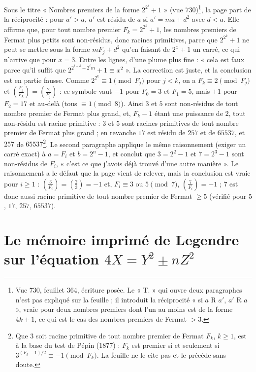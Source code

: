 \documentclass[11pt,a4paper]{article}
\begin{document}
Sous le titre « Nombres premiers de la forme $2^{2^i}+1$ » (vue 730)\footnote{Vue 730, feuillet 364, écriture posée. Le « T. » qui ouvre deux paragraphes n'est pas expliqué sur la feuille ; il introduit la réciprocité « si $a$ R $a'$, $a'$ R $a$ », vraie pour deux nombres premiers dont l'un au moins est de la forme $4k+1$, ce qui est le cas des nombres premiers de Fermat $>3$.}, la page part de la réciprocité : pour $a'>a$, $a'$ est résidu de $a$ si $a'=ma+d^2$ avec $d<a$. Elle affirme que, pour tout nombre premier $F_k=2^{2^k}+1$, les nombres premiers de Fermat plus petits sont non-résidus, donc racines primitives, parce que $2^{2^k}+1$ ne peut se mettre sous la forme $mF_j+d^2$ qu'en faisant de $2^{x}+1$ un carré, ce qui n'arrive que pour $x=3$. Entre les lignes, d'une plume plus fine : « cela est faux parce qu'il suffit que $2^{2^{i+\delta}-2^i m}+1\equiv x^2$ ». La correction est juste, et la conclusion est en partie fausse. Comme $2^{2^k}\equiv 1\pmod{F_j}$ pour $j<k$, on a $F_k\equiv 2\pmod{F_j}$ et $\left(\frac{F_j}{F_k}\right)=\left(\frac{2}{F_j}\right)$ : ce symbole vaut $-1$ pour $F_0=3$ et $F_1=5$, mais $+1$ pour $F_2=17$ et au-delà (tous $\equiv 1\pmod 8$). Ainsi $3$ et $5$ sont non-résidus de tout nombre premier de Fermat plus grand, et, $F_k-1$ étant une puissance de $2$, tout non-résidu est racine primitive : $3$ et $5$ sont racines primitives de tout nombre premier de Fermat plus grand ; en revanche $17$ est résidu de $257$ et de $65537$, et $257$ de $65537$\footnote{Que $3$ soit racine primitive de tout nombre premier de Fermat $F_k$, $k\ge1$, est à la base du test de Pépin (1877) : $F_k$ est premier si et seulement si $3^{(F_k-1)/2}\equiv-1\pmod{F_k}$. La feuille ne le cite pas et le précède sans doute.}. Le second paragraphe applique le même raisonnement (exiger un carré exact) à $a=F_i$ et $b=2^n-1$, et conclut que $3=2^2-1$ et $7=2^3-1$ sont non-résidus de $F_i$, « c'est ce que j'avois déjà trouvé d'une autre manière ». Le raisonnement a le défaut que la page vient de relever, mais la conclusion est vraie pour $i\ge1$ : $\left(\frac{3}{F_i}\right)=\left(\frac{2}{3}\right)=-1$ et, $F_i\equiv 3$ ou $5\pmod 7$, $\left(\frac{7}{F_i}\right)=-1$ ; $7$ est donc aussi racine primitive de tout nombre premier de Fermat $\ge5$ (vérifié pour $5$, $17$, $257$, $65537$).

\section*{Le mémoire imprimé de Legendre sur l'équation $4X = Y^2 \pm nZ^2$}
\end{document}
